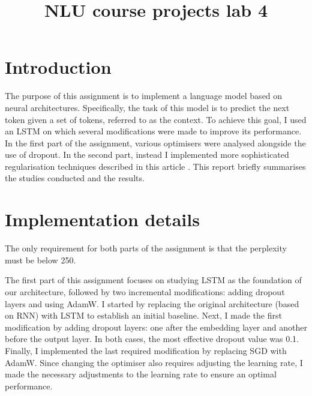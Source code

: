 \documentclass[a4paper]{article}
\title{NLU course projects lab 4}
\begin{document}
\maketitle

\section{Introduction}
The purpose of this assignment is to implement a language model based on neural architectures.
Specifically, the task of this model is to predict the next token given a set of tokens, referred to as the context.
To achieve this goal, I used an LSTM on which several modifications were made to improve its performance. 
In the first part of the assignment, various optimisers were analysed alongside the use of dropout. In the second part, instead I implemented more sophisticated regularisation techniques described in this article \cite{merity2017regularizing}.
This report briefly summarises the studies conducted and the results.

\section{Implementation details}
The only requirement for both parts of the assignment is that the perplexity must be below 250.

The first part of this assignment focuses on studying LSTM as the foundation of our architecture, followed by two incremental modifications: adding dropout layers and using AdamW.
I started by replacing the original architecture (based on RNN) with LSTM to establish an initial baseline.
Next, I made the first modification by adding dropout layers: one after the embedding layer and another before the output layer. In both cases, the most effective dropout value was 0.1.
Finally, I implemented the last required modification by replacing SGD with AdamW. Since changing the optimiser also requires adjusting the learning rate, I made the necessary adjustments to the learning rate to ensure an optimal performance.
\end{document}
